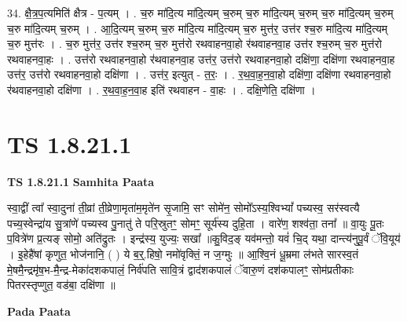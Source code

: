 \documentclass[17pt]{extarticle}
\begin{document}
34. क्षै॒त्र॒प॒त्यमिति॑ क्षैत्र - प॒त्यम् । . च॒रु मा॑दि॒त्य मा॑दि॒त्यम् च॒रुम् च॒रु मा॑दि॒त्यम् च॒रुम् च॒रु मा॑दि॒त्यम् च॒रुम् च॒रु मा॑दि॒त्यम् च॒रुम् । . आ॒दि॒त्यम् च॒रुम् च॒रु मा॑दि॒त्य मा॑दि॒त्यम् च॒रु मुत्त॑र॒ उत्त॑र श्च॒रु मा॑दि॒त्य मा॑दि॒त्यम् च॒रु मुत्त॑रः । . च॒रु मुत्त॑र॒ उत्त॑र श्च॒रुम् च॒रु मुत्त॑रो रथवाहनवा॒हो र॑थवाहनवा॒ह उत्त॑र श्च॒रुम् च॒रु मुत्त॑रो रथवाहनवा॒हः । . उत्त॑रो रथवाहनवा॒हो र॑थवाहनवा॒ह उत्त॑र॒ उत्त॑रो रथवाहनवा॒हो दक्षि॑णा॒ दक्षि॑णा रथवाहनवा॒ह उत्त॑र॒ उत्त॑रो रथवाहनवा॒हो दक्षि॑णा । . उत्त॑र॒ इत्युत् - त॒रः॒ । . र॒थ॒वा॒ह॒न॒वा॒हो दक्षि॑णा॒ दक्षि॑णा रथवाहनवा॒हो र॑थवाहनवा॒हो दक्षि॑णा । . र॒थ॒वा॒ह॒न॒वा॒ह इति॑ रथवाहन - वा॒हः । . दक्षि॒णेति॒ दक्षि॑णा । \newline
\pagebreak
{}
\section*{ TS 1.8.21.1 }

\textbf{TS 1.8.21.1 } \newline
\textbf{Samhita Paata} \newline

स्वा॒द्वीं त्वा᳚ स्वा॒दुना॑ ती॒व्रां ती॒व्रेणा॒मृता॑म॒मृते॑न सृ॒जामि॒ सꣳ सोमे॑न॒ सोमो᳚ऽस्य॒श्विभ्यां᳚ पच्यस्व॒ सर॑स्वत्यै पच्य॒स्वेन्द्रा॑य सु॒त्रांणे॑ पच्यस्व पु॒नातु॑ ते परि॒स्रुतꣳ॒॒ सोमꣳ॒॒ सूर्य॑स्य दुहि॒ता । वारे॑ण॒ शश्व॑ता॒ तना᳚ ॥ वा॒युः पू॒तः प॒वित्रे॑ण प्र॒त्यङ् सोमो॒ अति॑द्रुतः । इन्द्र॑स्य॒ युज्यः॒ सखा᳚ ॥कु॒विद॒ङ् यव॑मन्तो॒ यवं॑ चि॒द् यथा॒  दान्त्य॑नुपू॒र्वं ॅवि॒यूय॑ । इ॒हेहै॑षां कृणुत॒ भोज॑नानि॒ ( ) ये ब॒र्॒.हिषो॒ नमो॑वृक्तिं॒ न ज॒ग्मुः ॥ आ॒श्वि॒नं धू॒म्रमा ल॑भते सारस्व॒तं मे॒षमै॒न्द्रमृ॑ष॒भ-मै॒न्द्र-मेका॑दशकपालं॒ निर्व॑पति सावि॒त्रं द्वाद॑शकपालं ॅवारु॒णं दश॑कपालꣳ॒॒ सोम॑प्रतीकाः पितरस्तृप्णुत॒ वड॑बा॒ दक्षि॑णा ॥ \newline

\textbf{Pada Paata} \newline
\end{document}
